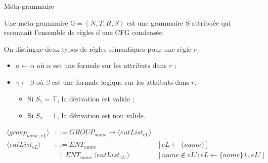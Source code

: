 \begin{frame}{Méta-grammaire}
    \begin{definition}
        Une méta-grammaire $\mathbb{G} = (N, T, R, S)$ est une grammaire S-attribuée qui reconnait l'ensemble de règles d'une CFG condensée.

        On distingue deux types de règles sémantiques pour une règle $r$ :
        \begin{itemize}
            \item $a \gets \alpha$ %
            où $\alpha$ est une formule sur les attributs dans $r$ ;
            \item $\gamma \gets \beta$ où $\beta$ est une formule logique sur les attributs dans $r$.
                  \pause
                  \begin{itemize}
                      \item Si $S_\gamma = \top$, la dérivation est valide ;
                      \item Si $S_\gamma = \bot$, la dérivation est non valide.
                  \end{itemize}
        \end{itemize}
    \end{definition}
    \pause
    \small
    \begin{align*}
        \langle group_{name, eL} \rangle & ::= GROUP_{name} \to \langle entList_{eL} \rangle                                                    \\
        \langle entList_{eL} \rangle     & ::= ENT_{name}                                       & [eL \gets \{name\}]                           \\
                                         & ~~ \mid ~ ENT_{name} ~ \langle entList_{eL'} \rangle & [name \notin eL'; eL \gets \{name\} \cup eL']
    \end{align*}
\end{frame}


